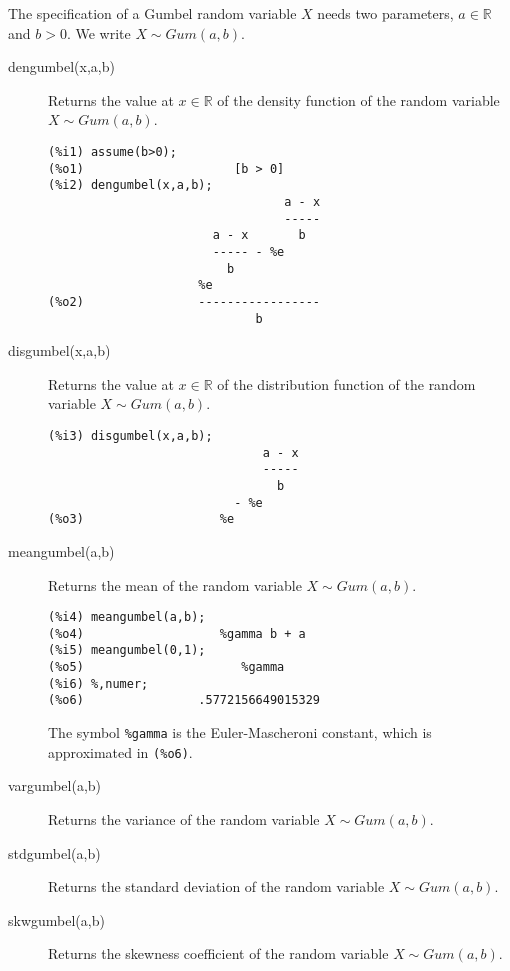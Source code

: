 \documentclass[12pt,a4paper]{article}
\newcommand{\R}{\mathbb{R}}
\begin{document}
The specification of a Gumbel random variable $X$ needs two parameters, $a \in \R$ and $b>0$. We write $X \sim Gum(a,b)$.

\begin{description}

\item[dengumbel(x,a,b)] Returns the value at $x \in \R$ of the density function of the random variable $X \sim Gum(a,b)$.

\begin{verbatim}
(%i1) assume(b>0);
(%o1)                     [b > 0]
(%i2) dengumbel(x,a,b);
                                 a - x
                                 -----
                       a - x       b
                       ----- - %e
                         b
                     %e
(%o2)                -----------------
                             b
\end{verbatim}

\item[disgumbel(x,a,b)] Returns the value at $x \in \R$ of the distribution function of the random variable $X \sim Gum(a,b)$.

\begin{verbatim}
(%i3) disgumbel(x,a,b);
                              a - x
                              -----
                                b
                          - %e
(%o3)                   %e
\end{verbatim}

\item[meangumbel(a,b)] Returns the mean of the random variable  $X \sim Gum(a,b)$.

\begin{verbatim}
(%i4) meangumbel(a,b);
(%o4)                   %gamma b + a
(%i5) meangumbel(0,1);
(%o5)                      %gamma
(%i6) %,numer;
(%o6)                .5772156649015329
\end{verbatim}
The symbol \verb|%gamma| is the Euler-Mascheroni constant, which is approximated in \verb|(%o6)|.

\item[vargumbel(a,b)] Returns the variance of the random variable  $X \sim Gum(a,b)$.

\item[stdgumbel(a,b)] Returns the standard deviation of the random variable  $X \sim Gum(a,b)$.

\item[skwgumbel(a,b)] Returns the skewness coefficient of the random variable  $X \sim Gum(a,b)$.


\end{description}
\end{document}
